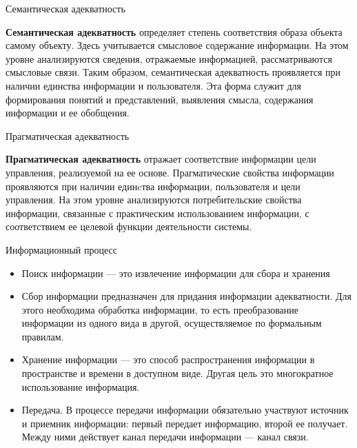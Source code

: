 \documentclass{beamer}
\begin{document}
\begin{frame}{Семантическая адекватность}

\textbf{Семантическая адекватность} определяет степень соответствия образа объекта самому объекту. 
Здесь учитывается смысловое содержание информации. На этом уровне анализируются сведения, отражаемые информацией, 
рассматриваются смысловые связи. 
Таким образом, семантическая адекватность проявляется при наличии единства информации и пользователя. 
Эта форма служит для формирования понятий и представлений, выявления смысла, содержания информации и ее обобщения.

\end{frame}

\begin{frame}{Прагматическая адекватность}

\textbf{Прагматическая адекватность} отражает соответствие информации цели управления, реализуемой на ее основе. 
Прагматические свойства информации проявляются при наличии единcтва информации, пользователя и цели управления. 
На этом уровне анализируются потребительские свойства информации, связанные с практическим использованием информации, 
с соответствием ее целевой функции деятельности системы. 

\end{frame}

\begin{frame}{Информационный процесс}

\begin{small}

\begin{itemize}


  \item Поиск информации — это извлечение  информации  для сбора и хранения 

  \item Сбор информации предназначен для придания информации адекватности.  Для этого необходима обработка информации, то есть
   преобразование информации из одного вида в другой, осуществляемое по формальным правилам. 
 
  \item Хранение информации — это способ распространения информации в пространстве и времени в доступном виде. Другая цель это  многократное
   использование информация. 

  \item  Передача. В процессе передачи информации обязательно участвуют источник и приемник информации: первый передает информацию, второй ее получает. Между ними действует 
  канал передачи информации — канал связи. 
 
\end{itemize}

\end{small}

\end{frame}
\end{document}
